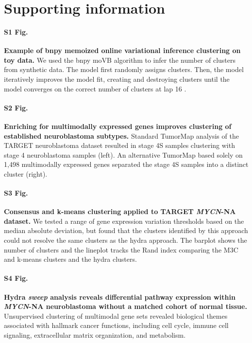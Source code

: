 \documentclass[10pt,letterpaper]{article}
\begin{document}
\section*{Supporting information}

\paragraph*{S1 Fig.}
\label{S1_Fig}
{\bf Example of bnpy memoized online variational inference clustering on toy data.} We used the bnpy moVB algorithm to infer the number of clusters from synthetic data. The model first randomly assigns clusters. Then, the model iteratively improves the model fit, creating and destroying clusters until the model converges on the correct number of clusters at lap 16 \cite{hughesBnpyReliableScalable}.

\paragraph*{S2 Fig.}
\label{S2_Fig}
{\bf Enriching for multimodally expressed genes improves clustering of established neuroblastoma subtypes.} Standard TumorMap analysis of the TARGET neuroblastoma dataset resulted in stage 4S samples clustering with stage 4 neuroblastoma samples (left). An alternative TumorMap based solely on 1,498 multimodally expressed genes separated the stage 4S samples into a distinct cluster (right).

\paragraph*{S3 Fig.}
\label{S3_Fig}
{\bf{Consensus and k-means clustering applied to TARGET \textit{MYCN}-NA dataset.}} We tested a range of gene expression variation thresholds based on the median absolute deviation, but found that the clusters identified by this approach could not resolve the same clusters as the hydra approach. The barplot shows the number of clusters and the lineplot tracks the Rand index comparing the M3C and k-means clusters and the hydra clusters.

\paragraph*{S4 Fig.}
\label{S4_Fig}{\bf Hydra \textit{sweep} analysis reveals differential pathway expression within \textit{MYCN}-NA neuroblastoma without a matched cohort of normal tissue.}
Unsupervised clustering of multimodal gene sets revealed biological themes associated with hallmark cancer functions, including cell cycle, immune cell signaling, extracellular matrix organization, and metabolism.
\end{document}
